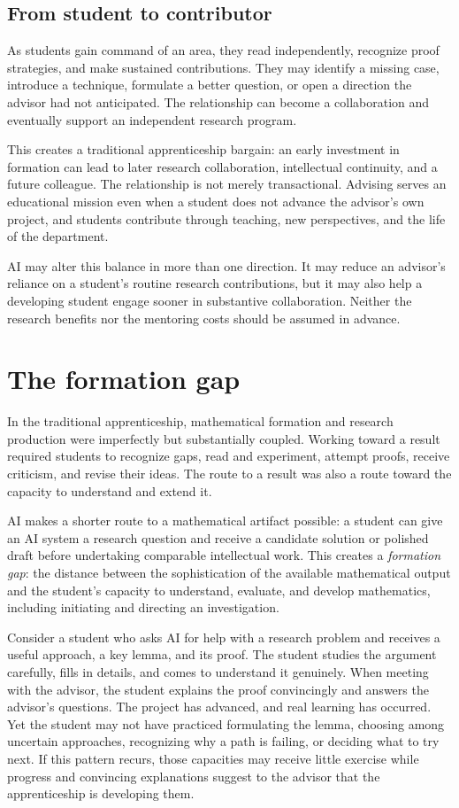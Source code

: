 \documentclass[11pt]{article}
\newcommand{\term}[1]{\emph{#1}}
\begin{document}
\subsection{From student to contributor}

As students gain command of an area, they read independently, recognize proof
strategies, and make sustained contributions. They may identify a missing case,
introduce a technique, formulate a better question, or open a direction the advisor had
not anticipated. The relationship can become a collaboration and eventually support
an independent research program.

This creates a traditional apprenticeship bargain: an early investment in formation
can lead to later research collaboration, intellectual continuity, and a future
colleague. The relationship is not merely transactional. Advising serves an educational
mission even when a student does not advance the advisor's own project, and students
contribute through teaching, new perspectives, and the life of the department.

AI may alter this balance in more than one direction. It may reduce an advisor's reliance
on a student's routine research contributions, but it may also help a developing student
engage sooner in substantive collaboration. Neither the research benefits nor the
mentoring costs should be assumed in advance.

\section{The formation gap}

In the traditional apprenticeship, mathematical formation and research production were
imperfectly but substantially coupled. Working toward a result required students to
recognize gaps, read and experiment, attempt proofs, receive criticism, and revise their
ideas. The route to a result was also a route toward the capacity to understand and
extend it.

AI makes a shorter route to a mathematical artifact possible: a student can give an AI
system a research question and receive a candidate solution or polished draft before
undertaking comparable intellectual work. This creates a \term{formation gap}: the
distance between the sophistication of the available mathematical output and the
student's capacity to understand, evaluate, and develop mathematics, including
initiating and directing an investigation.

Consider a student who asks AI for help with a research problem and receives a useful
approach, a key lemma, and its proof. The student studies the argument carefully, fills
in details, and comes to understand it genuinely. When meeting with the advisor, the student
explains the proof convincingly and answers the advisor's questions. The project has
advanced, and real learning has occurred. Yet the student may not have practiced
formulating the lemma, choosing among uncertain approaches, recognizing why a path is
failing, or deciding what to try next. If this pattern recurs, those capacities may
receive little exercise while progress and convincing explanations suggest to the
advisor that the apprenticeship is developing them.
\end{document}
